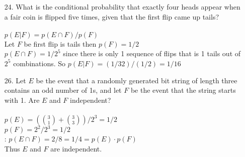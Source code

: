 \begin{itemize}
    \item[24.] What is the conditional probability that exactly four heads
          appear when a fair coin is flipped five times, given that
          the first flip came up tails? \\
          \answer \\
          $p(E | F) = p(E \cap F) / p(F)$\\
          Let $F$ be first flip is tails then $p(F) = 1/2$ \\
          $p(E \cap F) = 1/2^5$ since there is only 1 sequence of flips that is 1 tails
          out of $2^5$ combinations. So $p(E|F) = (1/32)/(1/2)= 1/16$

    \item[26.]  Let $E$ be the event that a randomly generated bit string
          of length three contains an odd number of 1s, and let $F$
          be the event that the string starts with 1. Are $E$ and $F$
          independent? \\
          \answer \\
          $p(E) = \left({3 \choose 1} + {3 \choose 3}\right) /2^3 = 1/2$ \\
          $p(F) = 2^2/2^3= 1/2$ \\
:          $p(E \cap F) = 2/8 = 1/4 = p(E) \cdot p(F)$ \\
          Thus $E$ and $F$ are independent.
\end{itemize}
